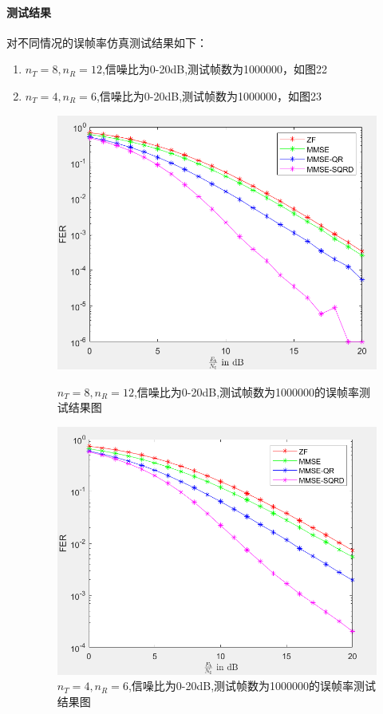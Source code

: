 \documentclass[a4paper,12pt]{article}
\begin{document}
	\paragraph{测试结果}
	对不同情况的误帧率仿真测试结果如下：
	\begin{enumerate}
		\item $n_T=8,n_R=12$,信噪比为0-20dB,测试帧数为1000000，如图22
		\item $n_T=4,n_R=6$,信噪比为0-20dB,测试帧数为1000000，如图23
		\begin{figure}[h]
			\centering
			\begin{minipage}{0.4\textwidth}
				\centering
				\includegraphics[width=\textwidth]{23.png}
				\caption{$n_T=8,n_R=12$,信噪比为0-20dB,测试帧数为1000000的误帧率测试结果图}
			\end{minipage}
			\qquad
			\begin{minipage}{0.4\textwidth}
				\centering
				\includegraphics[width=\textwidth]{24.png}
				\caption{$n_T=4,n_R=6$,信噪比为0-20dB,测试帧数为1000000的误帧率测试结果图}
			\end{minipage}
		\end{figure}
	\end{enumerate}
	\newpage
\end{document}

